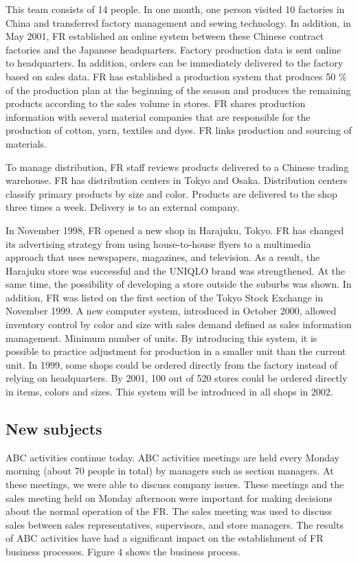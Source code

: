 \documentclass[12pt,]{article}
\begin{document}
This team consists of 14 people. In one month, one person visited 10
factories in China and transferred factory management and sewing
technology. In addition, in May 2001, FR established an online system
between these Chinese contract factories and the Japanese headquarters.
Factory production data is sent online to headquarters. In addition,
orders can be immediately delivered to the factory based on sales data.
FR has established a production system that produces 50 \% of the
production plan at the beginning of the season and produces the
remaining products according to the sales volume in stores. FR shares
production information with several material companies that are
responsible for the production of cotton, yarn, textiles and dyes. FR
links production and sourcing of materials.

To manage distribution, FR staff reviews products delivered to a Chinese
trading warehouse. FR has distribution centers in Tokyo and Osaka.
Distribution centers classify primary products by size and color.
Products are delivered to the shop three times a week. Delivery is to an
external company.

In November 1998, FR opened a new shop in Harajuku, Tokyo. FR has
changed its advertising strategy from using house-to-house flyers to a
multimedia approach that uses newspapers, magazines, and television. As
a result, the Harajuku store was successful and the UNIQLO brand was
strengthened. At the same time, the possibility of developing a store
outside the suburbs was shown. In addition, FR was listed on the first
section of the Tokyo Stock Exchange in November 1999. A new computer
system, introduced in October 2000, allowed inventory control by color
and size with sales demand defined as sales information management.
Minimum number of units. By introducing this system, it is possible to
practice adjustment for production in a smaller unit than the current
unit. In 1999, some shops could be ordered directly from the factory
instead of relying on headquarters. By 2001, 100 out of 520 stores could
be ordered directly in items, colors and sizes. This system will be
introduced in all shops in 2002.

\hypertarget{new-subjects}{%
\subsection{New subjects}\label{new-subjects}}

ABC activities continue today. ABC activities meetings are held every
Monday morning (about 70 people in total) by managers such as section
managers. At these meetings, we were able to discuss company issues.
These meetings and the sales meeting held on Monday afternoon were
important for making decisions about the normal operation of the FR. The
sales meeting was used to discuss sales between sales representatives,
supervisors, and store managers. The results of ABC activities have had
a significant impact on the establishment of FR business processes.
Figure 4 shows the business process.
\end{document}
